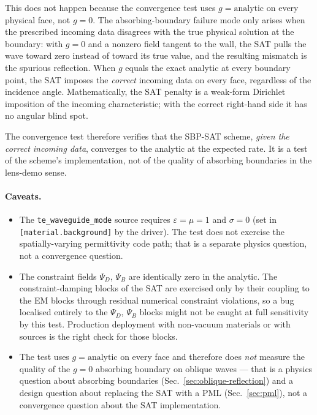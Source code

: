 \documentclass[11pt]{article}
\begin{document}
This does not happen because the convergence test uses
$g = \text{analytic}$ on every physical face, not $g = 0$. The
absorbing-boundary failure mode only arises when the prescribed
incoming data disagrees with the true physical solution at the
boundary: with $g = 0$ and a nonzero field tangent to the wall, the
SAT pulls the wave toward zero instead of toward its true value, and
the resulting mismatch is the spurious reflection.  When $g$ equals
the exact analytic at every boundary point, the SAT imposes the
\emph{correct} incoming data on every face, regardless of the
incidence angle.  Mathematically, the SAT penalty is a weak-form
Dirichlet imposition of the incoming characteristic;
with the correct right-hand side it has no angular blind spot.

The convergence test therefore verifies that the SBP-SAT scheme,
\emph{given the correct incoming data}, converges to the analytic at
the expected rate. It is a test of the scheme's implementation, not
of the quality of absorbing boundaries in the lens-demo sense.

\paragraph{Caveats.}
\begin{itemize}
  \item The \texttt{te\_waveguide\_mode} source requires
    $\varepsilon = \mu = 1$ and $\sigma = 0$ (set in
    \texttt{[material.background]} by the driver). The test does not
    exercise the spatially-varying permittivity code path; that is a
    separate physics question, not a convergence question.
  \item The constraint fields $\Psi_D$, $\Psi_B$ are identically
    zero in the analytic. The constraint-damping blocks of the SAT
    are exercised only by their coupling to the EM blocks through
    residual numerical constraint violations, so a bug localised
    entirely to the $\Psi_D$, $\Psi_B$ blocks might not be caught
    at full sensitivity by this test. Production deployment with
    non-vacuum materials or with sources is the right check for
    those blocks.
  \item The test uses $g = \text{analytic}$ on every face and
    therefore does \emph{not} measure the quality of the $g = 0$
    absorbing boundary on oblique waves — that is a physics
    question about absorbing boundaries (Sec.~\ref{sec:oblique-reflection})
    and a design question about replacing the SAT with a PML
    (Sec.~\ref{sec:pml}), not a convergence question about the SAT
    implementation.
\end{itemize}
\end{document}
